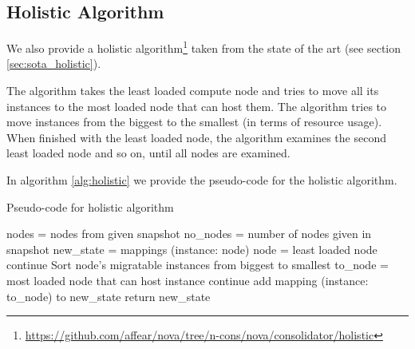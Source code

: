 \subsection{Holistic Algorithm}
\label{sub:algs_holistic}
We also provide a holistic algorithm\footnote{\url{https://github.com/affear/nova/tree/n-cons/nova/consolidator/holistic}} taken from the state of the art (see section \ref{sec:sota_holistic}).

The algorithm takes the least loaded compute node and tries to move all its instances to the most loaded node that can host them. The algorithm tries to move instances from the biggest to the smallest (in terms of resource usage). When finished with the least loaded node, the algorithm examines the second least loaded node and so on, until all nodes are examined.

In algorithm \ref{alg:holistic} we provide the pseudo-code for the holistic algorithm.

\begin{algorithm}[H]
\caption{Pseudo-code for holistic algorithm}
\label{alg:holistic}
\begin{algorithmic}[0]
	\State nodes = nodes from given snapshot
	\State no\_nodes = number of nodes given in snapshot
	\State new\_state = mappings (instance: node)
	\State
		\State node = least loaded node
		\State
			\State continue
		\EndIf
		\State
		\State Sort node's migratable instances from biggest to smallest
		\State
			\State to\_node = most loaded node that can host instance
				\State continue
			\EndIf
			\State add mapping (instance: to\_node) to new\_state
		\EndFor
	\EndFor
	\State
	\State return new\_state
\end{algorithmic}
\end{algorithm}